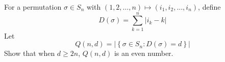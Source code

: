 For a permutation $ \sigma\in S_n$ with $ (1,2,\dots,n)\mapsto(i_1,i_2,\dots,i_n)$, define
\[ D(\sigma) = \sum_{k = 1}^n |i_k - k|
\]
Let
\[ Q(n,d) = \left|\left\{\sigma\in S_n : D(\sigma) = d\right\}\right|
\]
Show that when $ d \geq 2n$, $ Q(n,d)$ is an even number.